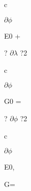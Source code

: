 \documentclass[a4paper,portrait,12pt]{article}
\begin{document}
\begin{flushleft}
c
\end{flushleft}





\begin{flushleft}
$\partial$$\phi$
\end{flushleft}





\begin{flushleft}
E0 +
\end{flushleft}





\begin{flushleft}
? $\partial$$\lambda$ ?2
\end{flushleft}


\begin{flushleft}
c
\end{flushleft}





\begin{flushleft}
$\partial$$\phi$
\end{flushleft}





\begin{flushleft}
G0 =
\end{flushleft}





\begin{flushleft}
? $\partial$$\phi$ ?2
\end{flushleft}


\begin{flushleft}
c
\end{flushleft}





\begin{flushleft}
$\partial$$\phi$
\end{flushleft}





\begin{flushleft}
E0,
\end{flushleft}





\begin{flushleft}
G=
\end{flushleft}
\end{document}
